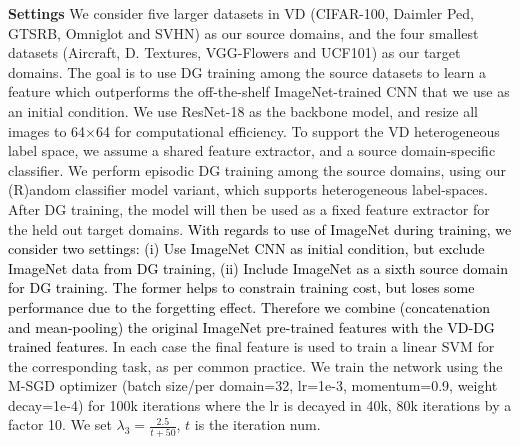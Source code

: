 \documentclass[10pt,twocolumn,letterpaper]{article}
\newcommand{\doublecheck}[1]{\textcolor{black}{#1}}
\newcommand{\keypoint}[1]{\vspace{0.1cm}\noindent\textbf{#1}\quad}
\newcommand{\cut}[1]{}
\begin{document}
\keypoint{Settings}  We consider  five larger datasets in VD (CIFAR-100, Daimler Ped, GTSRB, Omniglot and SVHN\cut{, excluding ImageNet\footnote{We always exploit ImageNet as an initial condition, but do not include it in DG training for computational feasibility}}) as our source domains, and the four smallest datasets (Aircraft, D. Textures, VGG-Flowers and UCF101) as our target domains. The goal is to use DG training among the source datasets to learn a feature which outperforms the off-the-shelf ImageNet-trained CNN that we use as an initial condition. We use ResNet-18 \cite{He2016resnet} as the backbone model, and resize all  images to 64$\times$64 for computational efficiency. To support the VD heterogeneous label space, we assume a shared feature extractor, and a source domain-specific classifier. We perform episodic DG training among the source domains, using our (R)andom classifier model variant, which supports heterogeneous label-spaces. After DG training, the model will then be used as a fixed feature extractor for the held out target domains. \doublecheck{With regards to use of ImageNet during training, we consider two settings: (i) Use ImageNet CNN as initial condition, but exclude ImageNet data from DG training, (ii) Include ImageNet as a sixth source domain for DG training. The former helps to constrain training cost, but loses some performance due to the forgetting effect. Therefore we combine (concatenation and mean-pooling) the original ImageNet pre-trained features with the VD-DG trained features. }
\cut{These are combined by combination (concatenation and mean-pooling) with the original ImageNet pre-trained features\footnote{Since ImageNet is excluded from source domains for computational feasibility, there is loss of performance for all models compared to the original feature due to the forgetting effect.}} In each case the final feature is used to train a linear SVM for the corresponding task, as per common practice. We train the network using the M-SGD optimizer (batch size/per domain=32, lr=1e-3, momentum=0.9, weight decay=1e-4) for 100k iterations where the lr is decayed in 40k, 80k iterations by a factor 10. We set $\lambda_3=\frac{2.5}{t+50}$, $t$ is the iteration num. 
\end{document}
